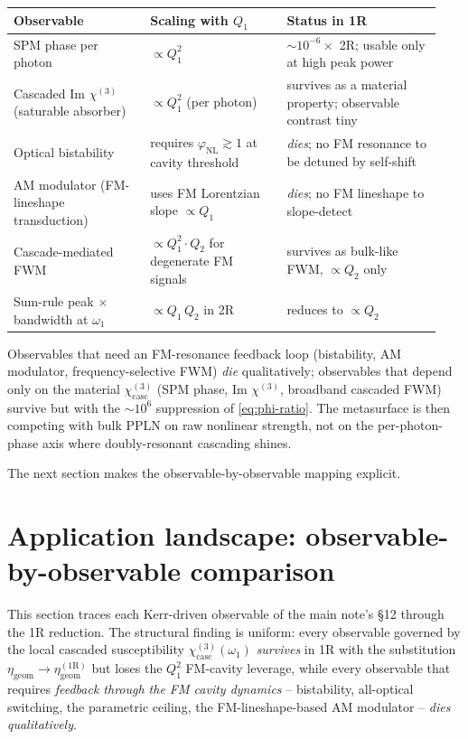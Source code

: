 \documentclass[11pt,a4paper]{article}
\newcommand{\chithree}{\chi^{(3)}}
\newcommand{\chicasc}{\chi^{(3)}_{\text{casc}}}
\begin{document}
\begin{center}\small
\begin{tabular}{p{0.30\linewidth}p{0.30\linewidth}p{0.34\linewidth}}
  \toprule
  Observable
   & Scaling with $Q_1$
   & Status in 1R \\
  \midrule
  SPM phase per photon
   & $\propto Q_1^{2}$
   & $\sim 10^{-6}\times$ 2R; usable only at high peak power \\[2pt]
  Cascaded Im $\chithree$ (saturable absorber)
   & $\propto Q_1^{2}$ (per photon)
   & survives as a material property; observable contrast tiny \\[2pt]
  Optical bistability
   & requires $\varphi_\text{NL}\!\gtrsim\!1$ at cavity threshold
   & \emph{dies}; no FM resonance to be detuned by self-shift \\[2pt]
  AM modulator (FM-lineshape transduction)
   & uses FM Lorentzian slope $\propto Q_1$
   & \emph{dies}; no FM lineshape to slope-detect \\[2pt]
  Cascade-mediated FWM
   & $\propto Q_1^{2}\cdot Q_2$ for degenerate FM signals
   & survives as bulk-like FWM, $\propto Q_2$ only \\[2pt]
  Sum-rule peak $\times$ bandwidth at $\omega_1$
   & $\propto Q_1\,Q_2$ in 2R
   & reduces to $\propto Q_2$ \\
  \bottomrule
\end{tabular}
\end{center}

Observables that need an FM-resonance feedback loop (bistability, AM
modulator, frequency-selective FWM) \emph{die} qualitatively; observables
that depend only on the material $\chithree_\text{casc}$ (SPM phase,
Im $\chithree$, broadband cascaded FWM) survive but with the $\sim 10^{6}$
suppression of \eqref{eq:phi-ratio}.  The metasurface is then competing
with bulk PPLN on raw nonlinear strength, not on the per-photon-phase axis
where doubly-resonant cascading shines.

The next section makes the observable-by-observable mapping explicit.

\section{Application landscape: observable-by-observable comparison}\label{sec:applications-1R}

This section traces each Kerr-driven observable of the main note's \S 12
through the 1R reduction.  The structural finding is uniform: every
observable governed by the local cascaded susceptibility
$\chicasc(\omega_1)$ \emph{survives} in 1R with the substitution
$\eta_\text{geom}\to\eta_\text{geom}^{(1\mathrm R)}$ but loses the
$Q_1^{2}$ FM-cavity leverage, while every observable that requires
\emph{feedback through the FM cavity dynamics} -- bistability, all-optical
switching, the parametric ceiling, the FM-lineshape-based AM
modulator -- \emph{dies qualitatively}.
\end{document}

